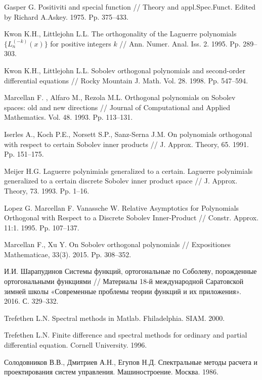 \begin{thebibliography}{20}
{Gasper G.}
Positiviti and special function
// Theory and appl.Spec.Funct. Edited by Richard A.Askey. 1975. Pp. 375--433.


{Kwon K.H., Littlejohn L.L.}
The orthogonality of the Laguerre polynomials $\{L_n^{(-k)}(x)\}$ for positive integers $k$
// Ann. Numer. Anal. Iss. 2. 1995. Pp. 289--303.


{Kwon K.H., Littlejohn L.L.}
Sobolev orthogonal polynomials and second-order differential equations
// Rocky Mountain J. Math. Vol. 28. 1998. Pp. 547--594.


{Marcellan F. , Alfaro M., Rezola M.L.} Orthogonal polynomials on Sobolev spaces: old and new directions
// Journal of Computational and Applied Mathematics. Vol. 48. 1993. Pp. 113--131.


{ Iserles A., Koch P.E., Norsett S.P., Sanz-Serna J.M.}
On polynomials  orthogonal  with respect  to certain Sobolev inner products
// J. Approx. Theory, 65. 1991. Pp. 151--175.


{Meijer H.G.} Laguerre polynimials generalized to a certain.
Laguerre polynimials generalized to a certain discrete Sobolev inner product space
// J. Approx. Theory, 73. 1993. Pp. 1--16.


{Lopez G. Marcellan F. Vanassche W.}
Relative Asymptotics for Polynomials Orthogonal with Respect to a Discrete Sobolev Inner-Product
// Constr. Approx. 11:1. 1995. Pp. 107--137.


{Marcellan F., Xu Y.}
On Sobolev orthogonal polynomials
// Expositiones Mathematicae, 33(3). 2015. Pp. 308--352.


И.И. Шарапудинов
Системы функций, ортогональные по Соболеву, порожденные ортогональными функциями
// Материалы 18-й международной Саратовской зимней школы «Современные проблемы теории функций и их приложения». 2016. С. 329--332.


{Trefethen  L.N.} Spectral methods in Matlab. Fhiladelphia. SIAM. 2000.


{Trefethen  L.N.}
Finite difference and spectral methods for ordinary and partial differential equation. Cornell University. 1996.


{Солодовников В.В., Дмитриев А.Н., Егупов Н.Д.}
Спектральные методы расчета и проектирования систем управления. Машиностроение. Москва. 1986.



\end{thebibliography}
